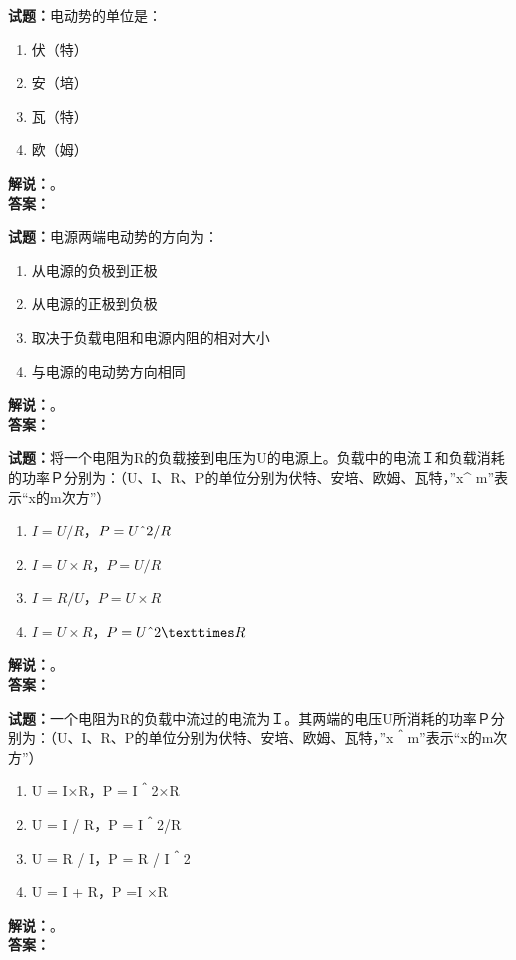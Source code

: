 \documentclass{ctexbook}
\begin{document}
\bigskip

\noindent\textbf{试题：}电动势的单位是：
\begin{enumerate}[leftmargin=3em]
  \item 伏（特）
  \item 安（培）
  \item 瓦（特）
  \item 欧（姆）
\end{enumerate}
\noindent\textbf{解说：}\textbf{}。\\\noindent\textbf{答案：}

\bigskip

\noindent\textbf{试题：}电源两端电动势的方向为：
\begin{enumerate}[leftmargin=3em]
  \item 从电源的负极到正极
  \item 从电源的正极到负极
  \item 取决于负载电阻和电源内阻的相对大小
  \item 与电源的电动势方向相同
\end{enumerate}
\noindent\textbf{解说：}\textbf{}。\\\noindent\textbf{答案：}

\bigskip

\noindent\textbf{试题：}将一个电阻为R的负载接到电压为U的电源上。负载中的电流Ｉ和负载消耗的功率Ｐ分别为：（U、I、R、P的单位分别为伏特、安培、欧姆、瓦特，”x\string^ m”表示“x的m次方”）
\begin{enumerate}[leftmargin=3em]
  \item \(I = U/R\)，\(P = U\string^ 2/R\)
  \item \(I = U\times R\)，\(P =U/R\)
  \item \(I = R/U\)，\(P = U\times R\)
  \item \(I = U\times R\)，\(P = U\string^ 2×R\)
\end{enumerate}
\noindent\textbf{解说：}\textbf{}。\\\noindent\textbf{答案：}

\bigskip

\noindent\textbf{试题：}一个电阻为R的负载中流过的电流为Ｉ。其两端的电压U所消耗的功率Ｐ分别为：（U、I、R、P的单位分别为伏特、安培、欧姆、瓦特，”x＾m”表示“x的m次方”）
\begin{enumerate}[leftmargin=3em]
  \item U = I×R，P = I＾2×R
  \item U = I / R，P = I＾2/R
  \item U = R / I，P = R / I＾2
  \item U = I + R，P =I ×R
\end{enumerate}
\noindent\textbf{解说：}\textbf{}。\\\noindent\textbf{答案：}
\end{document}

